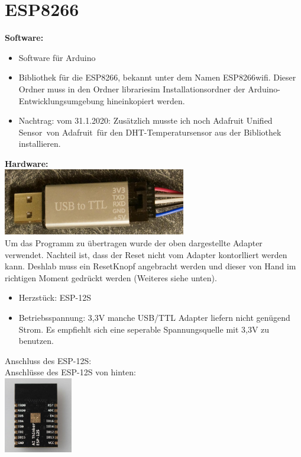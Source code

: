 \documentclass[11pt,fleqn]{book} %
\numberwithin{equation}{section} %
\numberwithin{figure}{section} %
\numberwithin{table}{section} %
\begin{document}
\section{ESP8266}
\textbf{Software:}\\
\begin{itemize}
 \item Software für Arduino
 \item Bibliothek für die ESP8266, bekannt unter dem Namen \glqq ESP8266wifi\grqq. Dieser Ordner muss in den Ordner \glqq libraries\grqq im Installationsordner der Arduino-Entwicklungsumgebung hineinkopiert werden.
 \item Nachtrag: vom 31.1.2020: Zusätzlich musste ich noch \glqq Adafruit Unified Sensor\grqq \ von \glqq Adafruit\grqq \ für den DHT-Temperatursensor aus der Bibliothek installieren.
\end{itemize}
\textbf{Hardware:\\}
\includegraphics[width=8cm]{Pictures/DSC01317.jpg}\\
Um das Programm zu übertragen wurde der oben dargestellte Adapter verwendet. Nachteil ist, dass der Reset nicht vom Adapter kontorlliert werden kann. Deshlab muss ein ResetKnopf angebracht werden und dieser von Hand im richtigen Moment gedrückt werden (Weiteres siehe unten).
\begin{itemize}
 \item Herzstück: ESP-12S
 \item Betriebsspannung: 3,3V manche USB/TTL Adapter liefern nicht genügend Strom. Es empfiehlt sich eine seperable Spannungsquelle mit 3,3V zu benutzen.
\end{itemize}
Anschluss des ESP-12S:\\
\newpage
Anschlüsse des ESP-12S von hinten:\\
\includegraphics[width=3cm]{Pictures/esp-12s.jpg}\\
\end{document}
